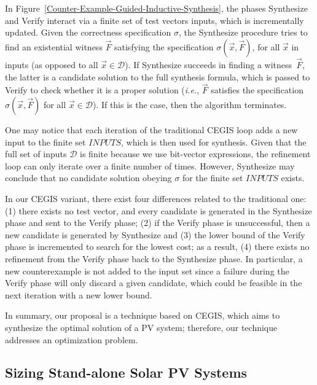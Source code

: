 \documentclass[10pt,journal,compsoc]{IEEEtran}
\begin{document}
In Figure~\ref{Counter-Example-Guided-Inductive-Synthesis}, the phases {\sc Synthesize} and {\sc Verify} interact via a finite set of test vectors {\sc inputs}, which is incrementally updated. Given the correctness specification $\sigma$, the {\sc Synthesize} procedure tries to find an existential witness $\vec{F}$ satisfying the specification $\sigma(\vec{x}, \vec{F})$, for all $\vec{x}$ in {\sc inputs} (as opposed to all $\vec{x} \in \mathcal{D}$). If {\sc Synthesize} succeeds in finding a witness~$\vec{F}$, the latter is a candidate solution to the full synthesis formula, which is passed to {\sc Verify} to check whether it is a proper solution ({\it i.e.}, $\vec{F}$ satisfies the specification $\sigma(\vec{x}, \vec{F})$ for all $\vec{x}\in\mathcal{D}$). If this is the case, then the algorithm terminates.

One may notice that each iteration of the traditional CEGIS loop adds a new input to the finite set $INPUTS$, which is then used for synthesis. Given that the full set of inputs $\mathcal{D}$ is finite because we use bit-vector expressions, the refinement loop can only iterate over a finite number of times. However, {\sc Synthesize} may conclude that no candidate solution obeying $\sigma$ for the finite set $INPUTS$ exists. 

In our CEGIS variant, there exist four differences related to the traditional one: 
(1) there exists no test vector, and every candidate is generated in the {\sc Synthesize} phase and sent to the {\sc Verify} phase; 
(2) if the {\sc Verify} phase is unsuccessful, then a new candidate is generated by {\sc Synthesize} and 
(3) the lower bound of the {\sc Verify} phase is incremented to search for the lowest cost; as a result,
(4) there exists no refinement from the {\sc Verify} phase back to the {\sc Synthesize} phase. In particular, a new counterexample is not added to the {\sc input} set since a failure during the {\sc Verify} phase will only discard a given candidate, which could be feasible in the next iteration with a new lower bound.

In summary, our proposal is a technique based on CEGIS, which aims to synthesize the optimal solution of a PV system; therefore, our technique addresses an optimization problem.

\subsection{Sizing Stand-alone Solar PV Systems}
\label{sec:sizing}
\end{document}
